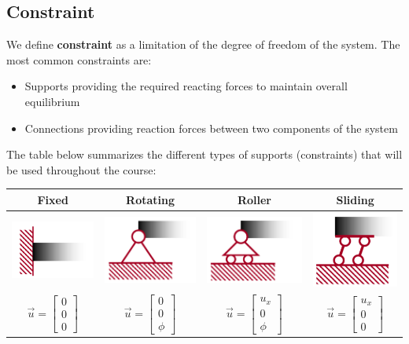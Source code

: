 \documentclass[class=report, crop=false, 12pt,a4paper]{standalone}
\begin{document}
\subsection{Constraint}
We define \textbf{constraint} as a limitation of the degree of freedom of the system. The most common constraints are:
\begin{itemize}[noitemsep]
  \item Supports providing the required reacting forces to maintain overall equilibrium
  \item Connections providing reaction forces between two components of the system
\end{itemize}
The table below summarizes the different types of supports (constraints) that will be used throughout the course:
\begin{center}
  \begin{tabular}{ |c|c|c|c| } 
   \hline
   Fixed & Rotating & Roller & Sliding \\
   \hline
   \includegraphics[width = 0.2 \textwidth]{../img/fixedsupport.PNG} & \includegraphics[width = 0.2 \textwidth]{../img/rotatingsupport.PNG} & \includegraphics[width = 0.2 \textwidth]{../img/rollersupport.PNG} & \includegraphics[width = 0.2 \textwidth]{../img/slidingsupport.PNG} \\
   \hline
   $\vec{u} = \left[ \begin{array}{ccc} 0 \\ 0 \\ 0 \end{array}\right]$ & $\vec{u} = \left[ \begin{array}{ccc} 0 \\ 0 \\ \phi \end{array}\right]$ & $\vec{u} = \left[ \begin{array}{ccc} u_x \\ 0 \\ \phi \end{array}\right]$ & $\vec{u} = \left[ \begin{array}{ccc} u_x \\ 0 \\ 0 \end{array}\right]$ \\

\end{tabular}
\end{center}
\end{document}
